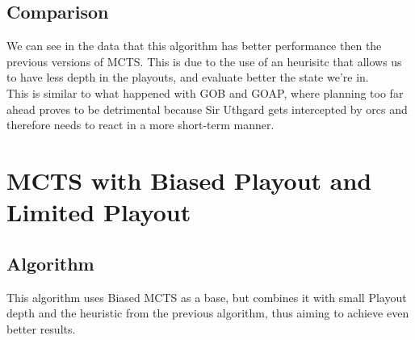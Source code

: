 \documentclass{article}
\begin{document}
  \subsection{Comparison}
  We can see in the data that this algorithm has better performance then the previous versions of MCTS. This is due to the use of an heurisitc that allows us to have less
  depth in the playouts, and evaluate better the state we're in. \\
  This is similar to what happened with GOB and GOAP, where planning too far ahead proves to be detrimental because Sir Uthgard gets intercepted by orcs and therefore needs to react in a more short-term manner.\\

  \section{MCTS with Biased Playout and Limited Playout}

  \subsection{Algorithm}
  This algorithm uses Biased MCTS as a base, but combines it with small Playout depth and the heuristic from the previous algorithm, 
  thus aiming to achieve even better results.
  
\end{document}
